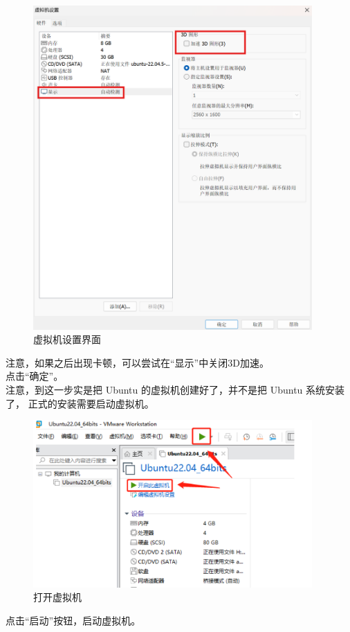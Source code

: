 \documentclass[UTF8]{ctexart}
\begin{document}
\begin{figure}[H]
    \centering
    \includegraphics[width=0.95\textwidth]{picture/Screenshot 2024-10-14 114300.png}
    \caption{虚拟机设置界面}
\end{figure}
注意，如果之后出现卡顿，可以尝试在“显示”中关闭3D加速。
\\点击“确定”。
\\注意，到这一步实是把 Ubuntu 的虚拟机创建好了，并不是把 Ubuntu 系统安装了，
正式的安装需要启动虚拟机。

\begin{figure}[H]
    \centering
    \includegraphics[width=0.95\textwidth]{picture/Screenshot 2024-10-14 160637.png}
    \caption{打开虚拟机}
\end{figure}
点击“启动”按钮，启动虚拟机。
\end{document}
